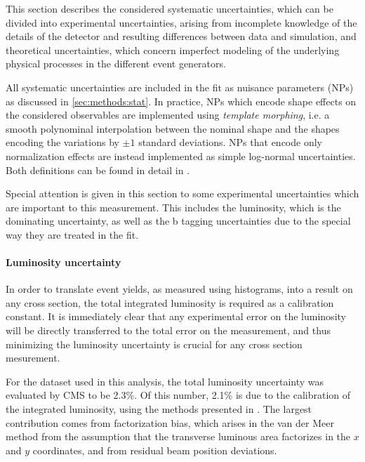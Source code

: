 This section describes the considered systematic uncertainties, which can be divided into experimental uncertainties, arising from incomplete knowledge of the details of the detector and resulting differences between data and simulation, and theoretical uncertainties, which concern imperfect modeling of the underlying physical processes in the different event generators. %

All systematic uncertainties are included in the fit as nuisance parameters (NPs) as discussed in \cref{sec:methods:stat}. In practice, NPs which encode shape effects on the considered observables are implemented using \textit{template morphing}, i.e. a smooth polynominal interpolation between the nominal shape and the shapes encoding the variations by $\pm 1$ standard deviations. NPs that encode only normalization effects are instead implemented as simple log-normal uncertainties. Both definitions can be found in detail in .

Special attention is given in this section to some experimental uncertainties which are important to this measurement. This includes the luminosity, which is the dominating uncertainty, as well as 
the b tagging uncertainties due to the special way they are treated in the fit.

\paragraph{Luminosity uncertainty}

In order to translate event yields, as measured using histograms, into a result on any cross section, the total integrated luminosity is required as a calibration constant. It is immediately clear that any experimental error on the luminosity will be directly transferred to the total error on the measurement, and thus minimizing the luminosity uncertainty is crucial for any cross section mesurement.

For the dataset used in this analysis, the total luminosity uncertainty was evaluated by CMS to be 2.3\%. Of this number, 2.1\% is due to the calibration of the integrated luminosity, using the methods presented in . The largest contribution comes from factorization bias, which arises in the van der Meer method from the assumption that the transverse luminous area factorizes in the $x$ and $y$ coordinates, and from residual beam position deviations.

